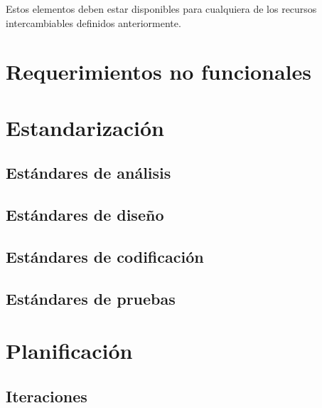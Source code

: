 Estos elementos deben estar disponibles para cualquiera de los recursos
intercambiables definidos anteriormente.

\section{Requerimientos no funcionales}

\section{Estandarización}
\subsection{Estándares de análisis}
\subsection{Estándares de diseño}
\subsection{Estándares de codificación}
\subsection{Estándares de pruebas}

\section{Planificación}
\subsection{Iteraciones}

